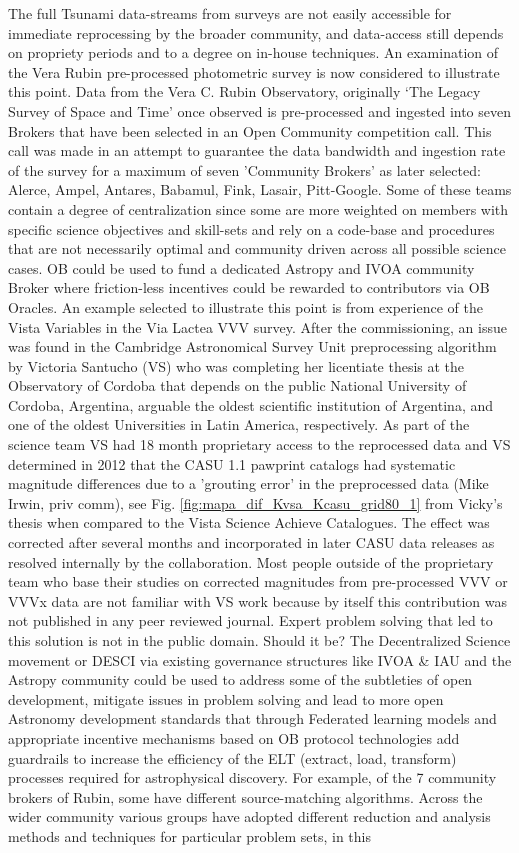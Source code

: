 \documentclass[final,5p,times,twocolumn,authoryear]{elsarticle}
\begin{document}
The full Tsunami data-streams from surveys are not easily accessible for immediate reprocessing by the broader community, and data-access still depends on propriety periods and to a degree on in-house techniques. An examination of the Vera Rubin pre-processed photometric survey is now considered to illustrate this point. Data from the Vera C. Rubin Observatory, originally `The Legacy Survey of Space and Time' once observed is pre-processed and ingested into seven Brokers that have been selected in an Open Community competition call.  This call was made in an attempt to guarantee the data bandwidth and ingestion rate of the survey for a maximum of seven 'Community Brokers' as later selected: Alerce, Ampel, Antares, Babamul, Fink, Lasair, Pitt-Google. Some of these teams contain a degree of centralization since some are more weighted on members with specific science objectives and skill-sets and rely on a code-base and procedures that are not necessarily optimal and community driven across all possible science cases. OB could be used to fund a dedicated Astropy and IVOA community Broker where friction-less incentives could be rewarded to contributors via OB Oracles. An example selected to illustrate this point is from experience of the Vista Variables in the Via Lactea VVV survey. After the commissioning, an issue was found in the Cambridge Astronomical Survey Unit preprocessing algorithm by Victoria Santucho (VS) who was completing her licentiate thesis at the Observatory of Cordoba that depends on the public National University of Cordoba, Argentina, arguable the oldest scientific institution of Argentina, and one of the oldest Universities in Latin America, respectively. As part of the science team VS had 18 month proprietary access to the reprocessed data and VS determined in 2012 that the CASU 1.1 pawprint catalogs had systematic magnitude differences due to a 'grouting error' in the preprocessed data (Mike Irwin, priv comm), see Fig. \ref{fig:mapa_dif_Kvsa_Kcasu_grid80_1} from Vicky's thesis when compared to the Vista Science Achieve Catalogues. The effect was corrected after several months and incorporated in later CASU data releases as resolved internally by the collaboration. Most people outside of the proprietary team who base their studies on corrected magnitudes from pre-processed VVV or VVVx data are not familiar with VS work because by itself this contribution was not published in any peer reviewed journal. Expert problem solving that led to this solution is not in the public domain. Should it be? The Decentralized Science movement or DESCI via existing governance structures like IVOA \& IAU and the Astropy community could be used to address some of the subtleties of open development, mitigate issues in problem solving and lead to more open Astronomy development standards that through Federated learning models and appropriate incentive mechanisms based on OB protocol technologies add guardrails to increase the efficiency of the ELT (extract, load, transform) processes required for astrophysical discovery. For example, of the 7 community brokers of Rubin, some have different source-matching \citep{bellm19} algorithms. Across the wider community various groups have adopted different reduction and analysis methods and techniques for particular problem sets, in this 
\end{document}
